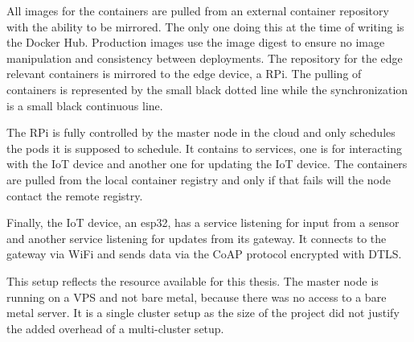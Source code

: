 All images for the containers are pulled from an external container repository with the ability to be mirrored. The only one doing this at the time of writing is the Docker Hub. Production images use the image digest to ensure no image manipulation and consistency between deployments. The repository for the edge relevant containers is mirrored to the edge device, a RPi. The pulling of containers is represented by the small black dotted line while the synchronization is a small black continuous line.

The RPi is fully controlled by the master node in the cloud and only schedules the pods it is supposed to schedule. It contains to services, one is for interacting with the IoT device and another one for updating the IoT device. The containers are pulled from the local container registry and only if that fails will the node contact the remote registry. 

Finally, the IoT device, an esp32, has a service listening for input from a sensor and another service listening for updates from its gateway. It connects to the gateway via WiFi and sends data via the CoAP protocol encrypted with DTLS.

This setup reflects the resource available for this thesis. The master node is running on a VPS and not bare metal, because there was no access to a bare metal server. It is a single cluster setup as the size of the project did not justify the added overhead of a multi-cluster setup.


